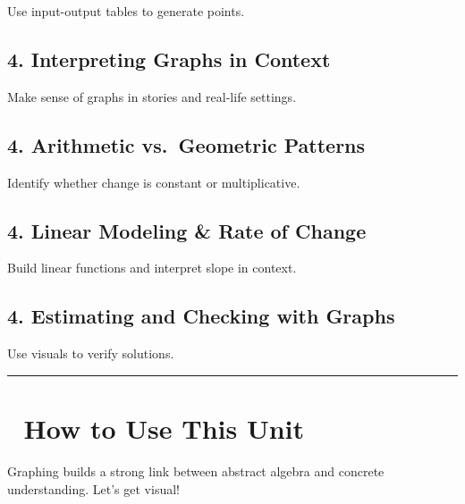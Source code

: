 \documentclass[
  letterpaper,
]{scrrept}
\begin{document}
Use input-output tables to generate points.

\subsection*{4. Interpreting Graphs in
Context}\label{interpreting-graphs-in-context}

Make sense of graphs in stories and real-life settings.

\subsection*{4. Arithmetic vs.~Geometric
Patterns}\label{arithmetic-vs.-geometric-patterns}

Identify whether change is constant or multiplicative.

\subsection*{4. Linear Modeling \& Rate of
Change}\label{linear-modeling-rate-of-change}

Build linear functions and interpret slope in context.

\subsection*{4. Estimating and Checking with
Graphs}\label{estimating-and-checking-with-graphs}

Use visuals to verify solutions.

\begin{center}\rule{0.5\linewidth}{0.5pt}\end{center}

\section*{🧭 How to Use This Unit}\label{how-to-use-this-unit-1}


Graphing builds a strong link between abstract algebra and concrete
understanding. Let's get visual!
\end{document}
